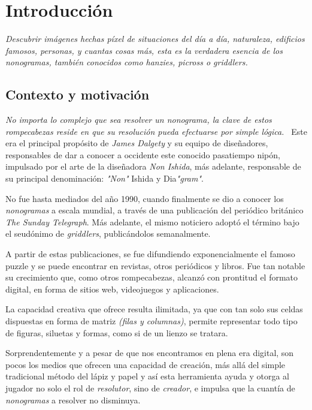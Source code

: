 \chapter{Introducción}

\textit{Descubrir imágenes hechas píxel de situaciones del día a día,
naturaleza, edificios famosos, personas, y cuantas cosas más, esta es la verdadera esencia de
los nonogramas, también conocidos como hanzies, picross o griddlers.}

\section{Contexto y motivación}

\textit{No importa lo complejo que sea resolver un nonograma, la clave de
estos rompecabezas reside en que su resolución pueda efectuarse por simple
lógica.~\cite{dalgety_2017}} Este era el principal propósito de \textit{James Dalgety} y su equipo
de diseñadores, responsables de dar a conocer a occidente este conocido
pasatiempo nipón, impulsado por el arte de la diseñadora \textit{Non Ishida}, más
adelante, responsable de su principal denominación: \textit{"Non"} Ishida y
Dia\textit{"gram"}.

No fue hasta mediados del año 1990, cuando finalmente se dio a conocer los \textit{nonogramas} a escala
mundial, a través de una publicación del periódico británico \textit{The Sunday
Telegraph}. Más adelante, el mismo noticiero adoptó el término bajo el
seudónimo de \textit{griddlers}, publicándolos semanalmente.

A partir de estas publicaciones, se fue difundiendo exponencialmente el famoso puzzle y
se puede encontrar en revistas, otros periódicos y libros. Fue tan notable su
crecimiento que, como otros rompecabezas, alcanzó con prontitud el formato
digital, en forma de sitios web, videojuegos y aplicaciones.

La capacidad creativa que ofrece resulta ilimitada, ya que con tan solo sus
celdas dispuestas en forma de matriz \textit{(filas y columnas)}, permite
representar todo tipo de figuras, siluetas y formas, como si de un lienzo se
tratara. 

Sorprendentemente y a pesar de que nos encontramos en plena era digital, son pocos los
medios que ofrecen una capacidad de creación, más allá del simple
tradicional método del lápiz y papel y así esta herramienta ayuda y otorga al jugador no solo el rol de \textit{resolutor}, sino de \textit{creador},
e impulsa que la cuantía de \textit{nonogramas} a resolver no disminuya.


